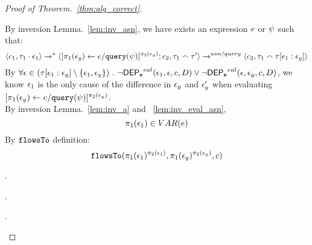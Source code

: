 \begin{proof}[Proof of Theorem.~\ref{thm:alg_correct}]
\begin{case}
\begin{subcase}
\begin{subsubcase}
\[\]
%
%
By inversion Lemma.~\ref{lem:inv_asn}, we have exists an expression $e$ or $\psi$ such that:
\[
\langle c_1, \mathtt{\tau}_1 \cdot \mathtt{\epsilon}_1 \rangle \rightarrow^{*} \langle [\mathrel{ \pi_1(\mathtt{\epsilon}_y) \leftarrow e / {\tt query}(\psi) }]{}^{\pi_2(\mathtt{\epsilon}_y)};c_2, \mathtt{\tau}_1 \smallfrown \mathtt{\tau}' \rangle \rightarrow^{asn / query} \langle c_2, \mathtt{\tau}_1 \smallfrown \mathtt{\tau}[\mathtt{\epsilon}_1:\mathtt{\epsilon}_y] \rangle 
\]
%
By $\forall \mathtt{\epsilon} \in (\mathtt{\tau}[\mathtt{\epsilon}_1:\mathtt{\epsilon}_y]\setminus \{\mathtt{\epsilon}_1, \mathtt{\epsilon}_y\}) ~.~
  \neg \mathsf{DEP_{\mathtt{e}}}^{val} (\mathtt{\epsilon}_1, \mathtt{\epsilon}, c, D) \lor \neg \mathsf{DEP_{\mathtt{e}}}^{val} (\mathtt{\epsilon}, \mathtt{\epsilon}_y, c, D)$,
we know $\mathtt{\epsilon}_1$ is the only cause of the difference in $\mathtt{\epsilon}_y$ and $\mathtt{\epsilon}_y'$ when evaluating $[\mathrel{ \pi_1(\mathtt{\epsilon}_y) \leftarrow e / {\tt query}(\psi) }]{}^{\pi_2(\mathtt{\epsilon}_y)}$.
%
\\
By inversion Lemma.~\ref{lem:inv_a} and ~\ref{lem:inv_eval_asn}, 
\[
  \pi_1(\mathtt{\epsilon}_1) \in VAR(e)
\]
%
By $\mathtt{flowsTo}$ definition:
\[
  \mathtt{flowsTo}(\pi_1(\mathtt{\epsilon}_1)^{\pi_2(\mathtt{\epsilon}_1)}, \pi_1(\mathtt{\epsilon}_y)^{\pi_2(\mathtt{\epsilon}_y)}, c)
\]
%
\end{subsubcase}
%
\end{subcase}
%
%
\begin{subcase}.
%
\end{subcase}
%
\begin{subcase}.
%
\end{subcase}
%
\begin{subcase}.
%
\end{subcase}
%
\end{case}
%
\end{proof}